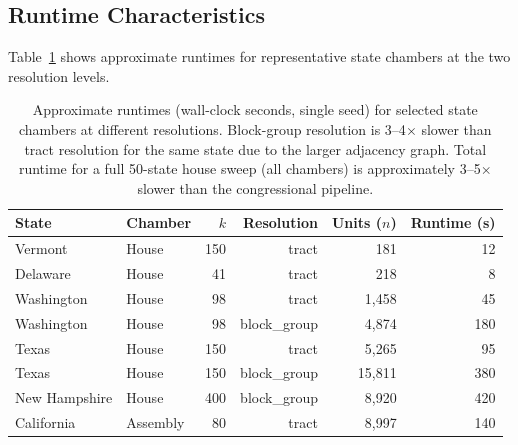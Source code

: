\subsection{Runtime Characteristics}
\label{sec:cli:runtime}

Table~\ref{tab:runtime} shows approximate runtimes for representative state
chambers at the two resolution levels.

\begin{table}[h]
\centering\small
\begin{tabular}{llrrrr}
\toprule
State & Chamber & $k$ & Resolution & Units ($n$) & Runtime (s) \\
\midrule
Vermont    & House  & 150 & tract       & 181   & 12 \\
Delaware   & House  & 41  & tract       & 218   & 8  \\
Washington & House  & 98  & tract       & 1,458 & 45 \\
Washington & House  & 98  & block\_group & 4,874 & 180 \\
Texas      & House  & 150 & tract       & 5,265 & 95 \\
Texas      & House  & 150 & block\_group & 15,811 & 380 \\
New Hampshire & House & 400 & block\_group & 8,920 & 420 \\
California & Assembly & 80 & tract      & 8,997 & 140 \\
\bottomrule
\end{tabular}
\caption{Approximate runtimes (wall-clock seconds, single seed) for selected
  state chambers at different resolutions. Block-group resolution is 3--4$\times$
  slower than tract resolution for the same state due to the larger adjacency graph.
  Total runtime for a full 50-state house sweep (all chambers) is approximately
  3--5$\times$ slower than the congressional pipeline.}
\label{tab:runtime}
\end{table}
